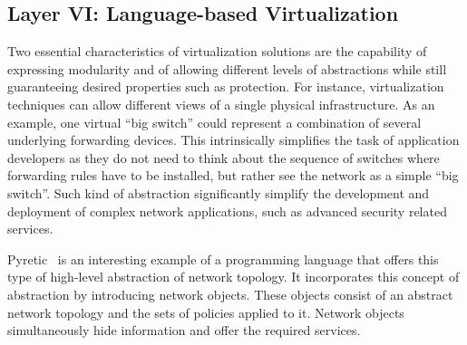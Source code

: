 


\subsection{Layer VI: Language-based Virtualization}
\label{sec:virtualizationslicing}

Two essential characteristics of virtualization solutions are the capability of expressing modularity 
and of allowing different levels of abstractions while still guaranteeing desired properties such as protection.
For instance, virtualization techniques can allow different views of a single physical infrastructure.
As an example, one virtual ``big switch'' could represent a combination of several underlying forwarding devices.
This intrinsically simplifies the task of application developers as they do not need to think about the sequence of switches where forwarding rules have to be installed, but rather see the network as a 
simple ``big switch''.
Such kind of abstraction significantly simplify the development 
and deployment of complex network applications, such as advanced security related services.

Pyretic~\cite{reich2013} is an interesting example of a programming language that offers this type of high-level abstraction of network topology.
It incorporates this concept of abstraction by introducing network objects.
These objects consist of an abstract network topology and the sets of policies applied to it.
Network objects simultaneously hide information and offer the required services.

